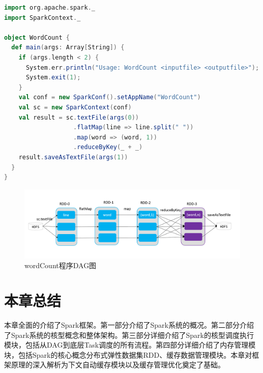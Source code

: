 \begin{lstlisting}[language=Scala]
import org.apache.spark._
import SparkContext._

object WordCount {
  def main(args: Array[String]) {
    if (args.length < 2) {
      System.err.println("Usage: WordCount <inputfile> <outputfile>");
      System.exit(1);
    }
    val conf = new SparkConf().setAppName("WordCount")
    val sc = new SparkContext(conf)
    val result = sc.textFile(args(0))
                   .flatMap(line => line.split(" "))
                   .map(word => (word, 1))
                   .reduceByKey(_ + _)
    result.saveAsTextFile(args(1))
  }
}
\end{lstlisting}

\begin{figure}
    \centering
    \includegraphics[width=1\textwidth]{Img/spark-wordcount.png}
    \caption{wordCount程序DAG图}
    \label{fig:word-count}
\end{figure}

\section{本章总结}

本章全面的介绍了Spark框架。第一部分介绍了Spark系统的概况。第二部分介绍了Spark系统的核型概念和整体架构。第三部分详细介绍了Spark的核型调度执行模块，包括从DAG到底层Task调度的所有流程。第四部分详细介绍了内存管理模块，包括Spark的核心概念分布式弹性数据集RDD、缓存数据管理模块。本章对框架原理的深入解析为下文自动缓存模块以及缓存管理优化奠定了基础。




